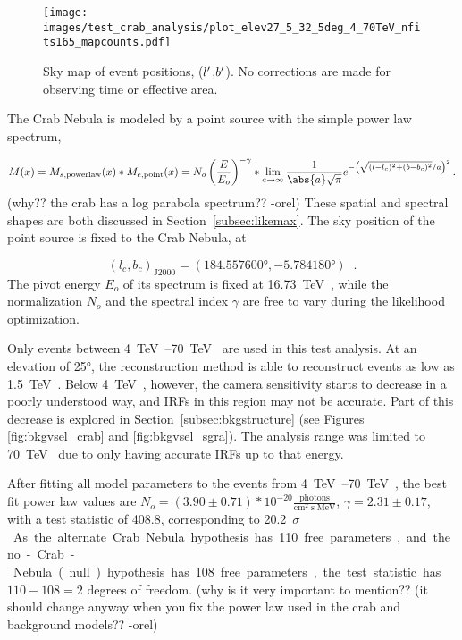     
  \begin{figure}[bt]
    \centering
    \texttt{[image: images/test\_crab\_analysis/plot\_elev27\_5\_32\_5deg\_4\_70TeV\_nfits165\_mapcounts.pdf]}
    \caption[Crab Nebula Counts Sky Map]
    {
      Sky map of event positions, ($l'$,$b'$).
      No corrections are made for observing time or effective area.
    }
    \label{fig:crab_skymap}
  \end{figure}
  
  The Crab Nebula is modeled by a point source with the simple power law spectrum,

  \begin{equation}\label{eqn:crab_model}
    M(\xtrue) = M_{s,\textrm{powerlaw}}(\xtrue) * M_{e,\textrm{point}}(\xtrue) = N_o \left ( \frac{\Etrue}{E_o} \right )^{-\gamma} * \lim_{a\to\infty} \frac{1}{ \abs{a} \sqrt{\pi} } e^{ - \left ( \sqrt{ (\ltrue-l_c)^2 + (\btrue-b_c)^2 }/a \right )^2 } \,.
  \end{equation}
  {\color{red}(why?? the crab has a log parabola spectrum?? -orel)}
  These spatial and spectral shapes are both discussed in Section~\ref{subsec:likemax}.
  The sky position of the point source is fixed to the Crab Nebula, at

  $$(l_c,b_c)_{\textrm{J2000}} = (\ang{184.557600},\ang{-5.784180}) \;\;.$$
  The pivot energy $E_o$ of its spectrum is fixed at \SI{16.73}{\TeV{}}, while the normalization $N_o$ and the spectral index $\gamma$ are free to vary during the likelihood optimization.
  
  Only events between \SIrange{4}{70}{\TeV{}} are used in this test analysis.
  At an elevation of \ang{25}, the reconstruction method is able to reconstruct events as low as \SI{1.5}{\TeV{}}.
  Below \SI{4}{\TeV{}}, however, the camera sensitivity starts to decrease in a poorly understood way, and IRFs in this region may not be accurate.
  Part of this decrease is explored in Section~\ref{subsec:bkgstructure} (see Figures \ref{fig:bkgvsel_crab} and \ref{fig:bkgvsel_sgra}).
  The analysis range was limited to \SI{70}{\TeV{}} due to only having accurate IRFs up to that energy.
    
  After fitting all model parameters to the events from \SIrange{4}{70}{\TeV{}}, the best fit power law values are $ N_o = \left(3.90\pm0.71\right)*10^{-20} \frac{\textrm{photons}}{\textrm{cm}^{2} \; \textrm{s} \; \textrm{MeV} } $, $ \gamma = 2.31 \pm 0.17 $, with a test statistic of 408.8, corresponding to \nicetilde{}\SI{20.2}{$\sigma$}.
  As the alternate Crab Nebula hypothesis has 110 free parameters, and the no-Crab-Nebula (null) hypothesis has 108 free parameters, the test statistic has $ 110 - 108 = 2 $ degrees of freedom.
  {\color{red}(why is it very important to mention?? (it should change anyway when you fix the power law used in the crab and background models?? -orel)}
  
